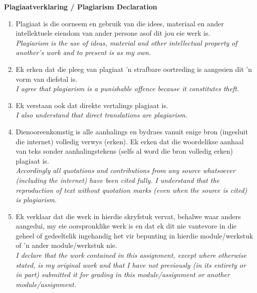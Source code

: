 \documentclass[11pt,a4paper]{article}
\begin{document}
{\Large \bf Plagiaatverklaring / Plagiarism Declaration}
\begin{enumerate}
    \item Plagiaat is die oorneem en gebruik van die idees, materiaal en ander intellektuele eiendom van ander persone asof dit jou eie werk is.\\
    \textit{Plagiarism is the use of ideas, material and other intellectual property of another's work and to present is as my own.}
    \item Ek erken dat die pleeg van plagiaat 'n strafbare oortreding is aangesien dit 'n vorm van diefstal is. \\
    \textit{I agree that plagiarism is a punishable offence because it constitutes theft.}
    \item Ek verstaan ook dat direkte vertalings plagiaat is.\\
    \textit{I also understand that direct translations are plagiarism.}
    \item Dienooreenkomstig is alle aanhalings en bydraes vanuit enige bron (ingesluit die internet) volledig verwys (erken). Ek erken dat die woordelikse aanhaal van teks sonder aanhalingstekens (selfs al word die bron volledig erken) plagiaat is.\\
    \textit{Accordingly all quotations and contributions from any source whatsoever (including the internet) have been cited fully. I understand that the reproduction of text without quotation marks (even when the source is cited) is plagiarism.}
    \item Ek verklaar dat die werk in hierdie skryfstuk vervat, behalwe waar anders aangedui, my eie oorspronklike werk is en dat ek dit nie vantevore in die geheel of gedeeltelik ingehandig het vir bepunting in hierdie module/werkstuk of 'n ander module/werkstuk nie.\\
    \textit{I declare that the work contained in this assignment, except where otherwise stated, is my original work and that I have not previously (in its entirety or in part) submitted it for grading in this module/assignment or another module/assignment.}
\end{enumerate}
\vspace{1cm}
\end{document}
